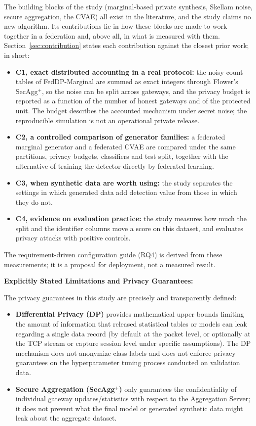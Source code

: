 The building blocks of the study (marginal-based private synthesis, Skellam noise, secure aggregation, the CVAE) all exist in the literature, and the study claims no new algorithm. Its contributions lie in how these blocks are made to work together in a federation and, above all, in what is measured with them. Section~\ref{sec:contribution} states each contribution against the closest prior work; in short:
\begin{itemize}
    \item \textbf{C1, exact distributed accounting in a real protocol:} the noisy count tables of FedDP-Marginal are summed as exact integers through Flower's SecAgg$^+$, so the noise can be split across gateways, and the privacy budget is reported as a function of the number of honest gateways and of the protected unit. The budget describes the accounted mechanism under secret noise; the reproducible simulation is not an operational private release.
    \item \textbf{C2, a controlled comparison of generator families:} a federated marginal generator and a federated CVAE are compared under the same partitions, privacy budgets, classifiers and test split, together with the alternative of training the detector directly by federated learning.
    \item \textbf{C3, when synthetic data are worth using:} the study separates the settings in which generated data add detection value from those in which they do not.
    \item \textbf{C4, evidence on evaluation practice:} the study measures how much the split and the identifier columns move a score on this dataset, and evaluates privacy attacks with positive controls.
\end{itemize}
The requirement-driven configuration guide (RQ4) is derived from these measurements; it is a proposal for deployment, not a measured result.

\noindent\textbf{Explicitly Stated Limitations and Privacy Guarantees:}

The privacy guarantees in this study are precisely and transparently defined:
\begin{itemize}
    \item \textbf{Differential Privacy (DP)} provides mathematical upper bounds limiting the amount of information that released statistical tables or models can leak regarding a single data record (by default at the packet level, or optionally at the TCP stream or capture session level under specific assumptions). The DP mechanism does not anonymize class labels and does not enforce privacy guarantees on the hyperparameter tuning process conducted on validation data.
    \item \textbf{Secure Aggregation (SecAgg$^+$)} only guarantees the confidentiality of individual gateway updates/statistics with respect to the Aggregation Server; it does not prevent what the final model or generated synthetic data might leak about the aggregate dataset.
\end{itemize}

